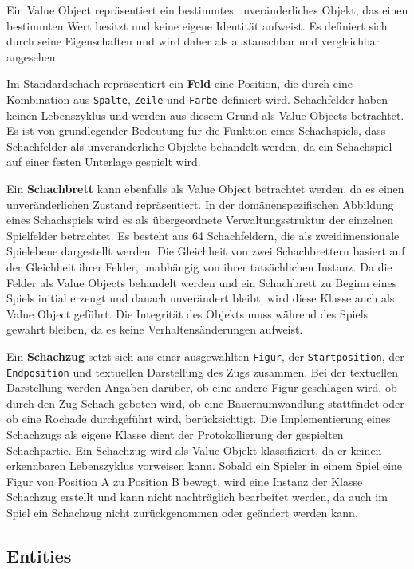Ein Value Object repräsentiert ein bestimmtes unveränderliches Objekt, das einen bestimmten Wert besitzt und keine eigene Identität aufweist. 
Es definiert sich durch seine Eigenschaften und wird daher als austauschbar und vergleichbar angesehen.

Im Standardschach repräsentiert ein \textbf{Feld} eine Position, die durch eine Kombination aus \texttt{Spalte}, \texttt{Zeile} und \texttt{Farbe} definiert wird. 
Schachfelder haben keinen Lebenszyklus und werden aus diesem Grund als Value Objects betrachtet. 
Es ist von grundlegender Bedeutung für die Funktion eines Schachspiels, dass Schachfelder als unveränderliche Objekte behandelt werden, da ein Schachspiel auf einer \glqq festen Unterlage\grqq{} gespielt wird. 

Ein \textbf{Schachbrett} kann ebenfalls als Value Object betrachtet werden, da es einen unveränderlichen Zustand repräsentiert. 
In der domänenspezifischen Abbildung eines Schachspiels wird es als übergeordnete Verwaltungsstruktur der einzelnen Spielfelder betrachtet. 
Es besteht aus 64 Schachfeldern, die als zweidimensionale Spielebene dargestellt werden.
Die Gleichheit von zwei Schachbrettern basiert auf der Gleichheit ihrer Felder, unabhängig von ihrer tatsächlichen Instanz. 
Da die Felder als Value Objects behandelt werden und ein Schachbrett zu Beginn eines Spiels initial erzeugt und danach unverändert bleibt, wird diese Klasse auch als Value Object geführt. 
Die Integrität des Objekts muss während des Spiels gewahrt bleiben, da es keine Verhaltensänderungen aufweist. 

Ein \textbf{Schachzug} setzt sich aus einer ausgewählten \texttt{Figur}, der \texttt{Startposition}, der \texttt{Endposition} und textuellen Darstellung des Zugs zusammen.
Bei der textuellen Darstellung werden Angaben darüber, ob eine andere Figur geschlagen wird, ob durch den Zug Schach geboten wird, ob eine Bauernumwandlung stattfindet oder ob eine Rochade durchgeführt wird, berücksichtigt. 
Die Implementierung eines Schachzugs als eigene Klasse dient der Protokollierung der gespielten Schachpartie. 
Ein Schachzug wird als Value Objekt klassifiziert, da er keinen erkennbaren Lebenszyklus vorweisen kann. 
Sobald ein Spieler in einem Spiel eine Figur von Position A zu Position B bewegt, wird eine Instanz der Klasse Schachzug erstellt und kann nicht nachträglich bearbeitet werden, da auch im Spiel ein Schachzug nicht zurückgenommen oder geändert werden kann. 

\subsection{Entities}

